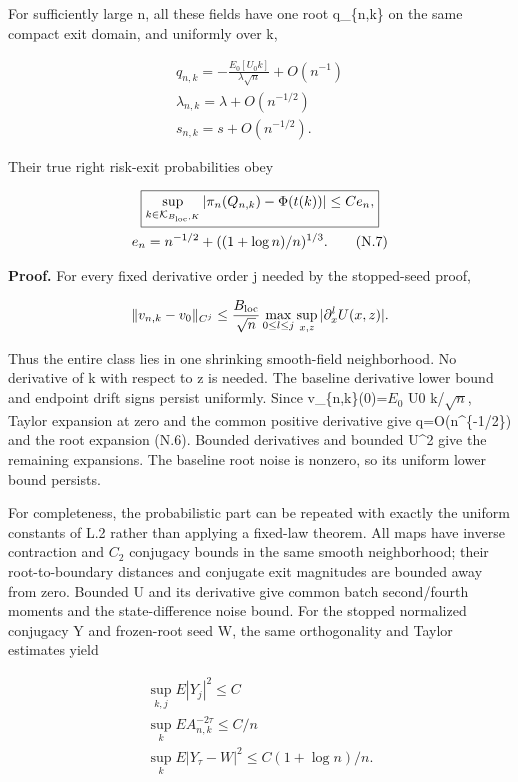 For sufficiently large n, all these fields have one root q\_\{n,k\} on the same compact exit domain, and uniformly over k,

\[
\begin{gathered}
q_{n,k}=-\frac{E_0[U_0 k]}{\lambda\sqrt n}+O(n^{-1}) \\
\lambda_{n,k}=\lambda+O(n^{-1/2}) \\
s_{n,k}=s+O(n^{-1/2}).
\tag{N.6}
\end{gathered}
\]

Their true right risk-exit probabilities obey

\[
\begin{gathered}
\boxed{\sup_{k\in\mathcal K_{B_{\rm loc},K}}
|\pi_n(Q_{n,k})-\Phi(t(k))|\le C e_n,} \\
e_n=n^{-1/2}+((1+\log n)/n)^{1/3}.
\tag{N.7}
\end{gathered}
\]

\textbf{Proof.} For every fixed derivative order j needed by the stopped-seed proof,

\[
\|v_{n,k}-v_0\|_{C^j}
\le \frac{B_{\rm loc}}{\sqrt n}
\max_{0\le l\le j}\sup_{x,z}|\partial_x^lU(x,z)|.
\]

Thus the entire class lies in one shrinking smooth-field neighborhood. No derivative of k with respect to z is needed. The baseline derivative lower bound and endpoint drift signs persist uniformly. Since v\_\{n,k\}(0)=\(E_0\) U0 k/\(\sqrt n\), Taylor expansion at zero and the common positive derivative give q=O(n\^{}\{-1/2\}) and the root expansion (N.6). Bounded derivatives and bounded U\^{}2 give the remaining expansions. The baseline root noise is nonzero, so its uniform lower bound persists.

For completeness, the probabilistic part can be repeated with exactly the uniform constants of L.2 rather than applying a fixed-law theorem. All maps have inverse contraction and \(C_2\) conjugacy bounds in the same smooth neighborhood; their root-to-boundary distances and conjugate exit magnitudes are bounded away from zero. Bounded U and its derivative give common batch second/fourth moments and the state-difference noise bound. For the stopped normalized conjugacy Y and frozen-root seed W, the same orthogonality and Taylor estimates yield

\[
\begin{gathered}
\sup_{k,j}E|Y_j|^2\le C \\
\sup_k E A_{n,k}^{-2\tau}\le C/n \\
\sup_k E|Y_\tau-W|^2\le C(1+\log n)/n.
\end{gathered}
\]

